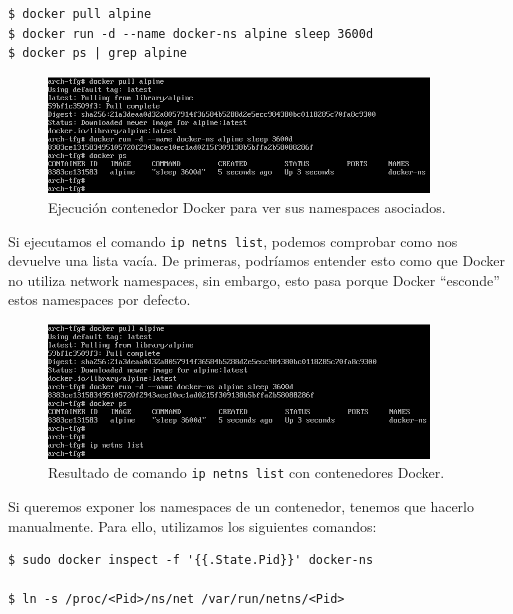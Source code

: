 \documentclass[12pt]{article}
\begin{document}
	\begin{verbatim}
$ docker pull alpine
$ docker run -d --name docker-ns alpine sleep 3600d
$ docker ps | grep alpine
	\end{verbatim}

	\begin{figure}[h!]
		\begin{center}
			\includegraphics[width=0.9\textwidth]{img/docker_ns1.png}
			\caption{Ejecución contenedor Docker para ver sus namespaces asociados.}
		\end{center}
	\end{figure}

	\noindent Si ejecutamos el comando \texttt{ip netns list}, podemos comprobar como nos devuelve una lista vacía. De primeras, podríamos entender esto como que Docker no utiliza network namespaces, sin embargo, esto pasa porque Docker ``esconde'' estos namespaces por defecto.
	
	\begin{figure}[h!]
		\begin{center}
			\includegraphics[width=0.9\textwidth]{img/docker_ns2.png}
			\caption{Resultado de comando \texttt{ip netns list} con contenedores Docker.}
			\end{center}
	\end{figure}

	\pagebreak
	
	\noindent Si queremos exponer los namespaces de un contenedor, tenemos que hacerlo manualmente. Para ello, utilizamos los siguientes comandos:
	
	\begin{verbatim}
$ sudo docker inspect -f '{{.State.Pid}}' docker-ns

$ ln -s /proc/<Pid>/ns/net /var/run/netns/<Pid>
	\end{verbatim}
\end{document}
